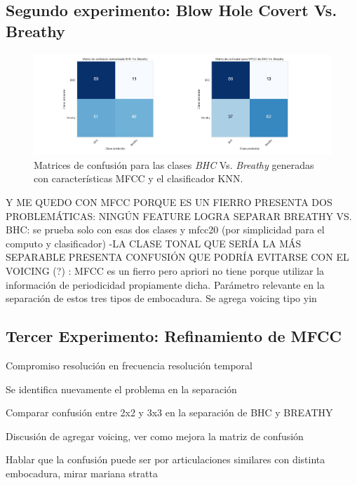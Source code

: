 \documentclass{article}
\begin{document}
\subsection{Segundo experimento: Blow Hole Covert Vs. Breathy}

\begin{figure}[H]
\begin{center}
\includegraphics[width=1\textwidth]{exp1_confusion2} 
\caption{Matrices de confusión para las clases \textit{BHC} Vs. \textit{Breathy} generadas con características MFCC y el clasificador KNN.}
\label{fig:exp1_confusion2}
\end{center}
\end{figure}

Y ME QUEDO CON MFCC PORQUE ES UN FIERRO
PRESENTA DOS PROBLEMÁTICAS: 
NINGÚN FEATURE LOGRA SEPARAR BREATHY VS. BHC: se prueba solo con esas dos clases y mfcc20 (por simplicidad para el computo y clasificador) 
-LA CLASE TONAL QUE SERÍA LA MÁS SEPARABLE PRESENTA CONFUSIÓN QUE PODRÍA EVITARSE CON EL VOICING (?) : MFCC es un fierro pero apriori no tiene porque utilizar la información de periodicidad propiamente dicha. Parámetro relevante en la separación de estos tres tipos de embocadura. Se agrega voicing tipo yin \cite{de2002yin}
 
\subsection{Tercer Experimento: Refinamiento de MFCC}
Compromiso resolución en frecuencia resolución temporal




Se identifica nuevamente el problema en la separación

Comparar confusión entre 2x2 y 3x3 en la separación de BHC y BREATHY

Discusión de agregar voicing, ver como mejora la matriz de confusión 

Hablar que la confusión puede ser por articulaciones similares con distinta embocadura, mirar mariana stratta
\end{document}
